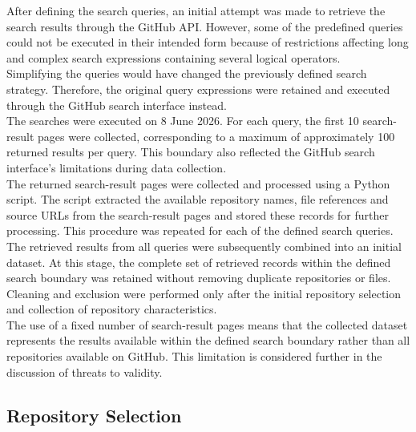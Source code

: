 After defining the search queries, an initial attempt was made to retrieve the search
results through the GitHub API. However, some of the predefined queries could not be
executed in their intended form because of restrictions affecting long and complex
search expressions containing several logical operators.
\\
Simplifying the queries would have changed the previously defined search strategy.
Therefore, the original query expressions were retained and executed through the
GitHub search interface instead.
\\
The searches were executed on 8 June 2026. For each
query, the first 10 search-result pages were collected, corresponding to a maximum of
approximately 100 returned results per query.
This boundary also reflected the GitHub search interface's limitations during data collection.
\\
The returned search-result pages were collected and processed using a Python script.
The script extracted the available repository names, file references and source URLs
from the search-result pages and stored these records for further processing. This
procedure was repeated for each of the defined search queries.
\\
The retrieved results from all queries were subsequently combined into an initial
dataset. At this stage, the complete set of retrieved records within the defined
search boundary was retained without removing duplicate repositories or files.
Cleaning and exclusion were performed only after the initial repository selection and
collection of repository characteristics.
\\
The use of a fixed number of search-result pages means that the collected dataset
represents the results available within the defined search boundary rather than all
repositories available on GitHub. This limitation is considered further in the
discussion of threats to validity.

\subsection{Repository Selection}

